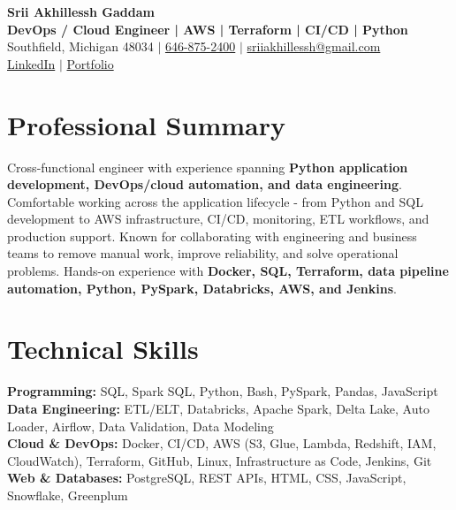 \documentclass[letterpaper,10pt]{article}
\begin{document}
\fontsize{9.35pt}{10.45pt}\selectfont

\begin{center}
    {\LARGE \textbf{Srii Akhillessh Gaddam}} \\[-1pt]
    \textbf{DevOps / Cloud Engineer | AWS | Terraform | CI/CD | Python} \\[2pt]
    Southfield, Michigan 48034 $|$
    \href{tel:6468752400}{646-875-2400} $|$
    \href{mailto:sriiakhillessh@gmail.com}{sriiakhillessh@gmail.com} \\[1pt]
    \href{https://www.linkedin.com/in/srii-akhiilessh-gaddam-b48668191/}{LinkedIn} $|$
    \href{https://sriiakhillesshg.github.io/portfolio/}{Portfolio}
\end{center}
\vspace{-8pt}

\section{Professional Summary}
\small{Cross-functional engineer with experience spanning \textbf{Python application development, DevOps/cloud automation, and data engineering}. Comfortable working across the application lifecycle - from Python and SQL development to AWS infrastructure, CI/CD, monitoring, ETL workflows, and production support. Known for collaborating with engineering and business teams to remove manual work, improve reliability, and solve operational problems. Hands-on experience with \textbf{Docker, SQL, Terraform, data pipeline automation, Python, PySpark, Databricks, AWS, and Jenkins}.}

\section{Technical Skills}
\small{
\textbf{Programming:} SQL, Spark SQL, Python, Bash, PySpark, Pandas, JavaScript \\
\textbf{Data Engineering:} ETL/ELT, Databricks, Apache Spark, Delta Lake, Auto Loader, Airflow, Data Validation, Data Modeling \\
\textbf{Cloud \& DevOps:} Docker, CI/CD, AWS (S3, Glue, Lambda, Redshift, IAM, CloudWatch), Terraform, GitHub, Linux, Infrastructure as Code, Jenkins, Git \\
\textbf{Web \& Databases:} PostgreSQL, REST APIs, HTML, CSS, JavaScript, Snowflake, Greenplum
}
\end{document}
